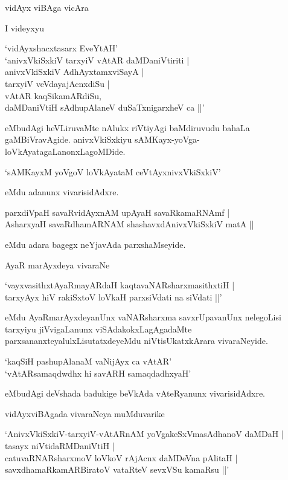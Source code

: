 vidAyx viBAga vicAra

I videyxyu 

\begin{shloka}
`vidAyxshacxtasarx EveYtAH'\\
`anivxVkiSxkiV tarxyiV vAtAR daMDaniVtiriti |\\
anivxVkiSxkiV AdhAyxtamxviSayA |\\
tarxyiV veVdayajAcnxdiSu |\\
vAtAR kaqSikamARdiSu,\\
daMDaniVtiH sAdhupAlaneV duSaTxnigarxheV ca ||'
\end{shloka}

eMbudAgi heVLiruvaMte nAlukx riVtiyAgi baMdiruvudu bahaLa gaMBiVravAgide. anivxVkiSxkiyu sAMKayx-yoVga-loVkAyatagaLanonxLagoMDide.

\begin{shloka}
`sAMKayxM yoVgoV loVkAyataM ceVtAyxnivxVkiSxkiV'
\end{shloka}

eMdu adanunx vivarisidAdxre.

\begin{shloka}
parxdiVpaH savaRvidAyxnAM upAyaH savaRkamaRNAmf |\\
AsharxyaH savaRdhamARNAM shashavxdAnivxVkiSxkiV matA ||
\end{shloka}

eMdu adara bagegx neYjavAda parxshaMseyide.

AyaR marAyxdeya vivaraNe

\begin{shloka}
`vayxvasithxtAyaRmayARdaH kaqtavaNARsharxmasithxtiH |\\
tarxyAyx hiV rakiSxtoV  loVkaH parxsiVdati na siVdati ||'
\end{shloka}

eMdu AyaRmarAyxdeyanUnx vaNARsharxma savxrUpavanUnx nelegoLisi tarxyiyu jiVvigaLanunx viSAdakokxLagAgadaMte parxsananxteyalulxLisutatxdeyeMdu niVtisUkatxkArara vivaraNeyide.

\begin{shloka}
`kaqSiH pashupAlanaM vaNijAyx ca vAtAR'\\
`vAtARsamaqdwdhx hi savARH samaqdadhxyaH'
\end{shloka}

eMbudAgi deVshada badukige beVkAda vAteRyanunx vivarisidAdxre.

vidAyxviBAgada vivaraNeya muMduvarike

\begin{shloka}
`AnivxVkiSxkiV-tarxyiV-vAtARnAM yoVgakeSxVmasAdhanoV daMDaH |\\
tasayx niVtidaRMDaniVtiH |\\
catuvaRNARsharxmoV loVkoV rAjAcnx daMDeVna pAlitaH |\\
savxdhamaRkamARBiratoV vataRteV sevxVSu kamaRsu ||'
\end{shloka}

